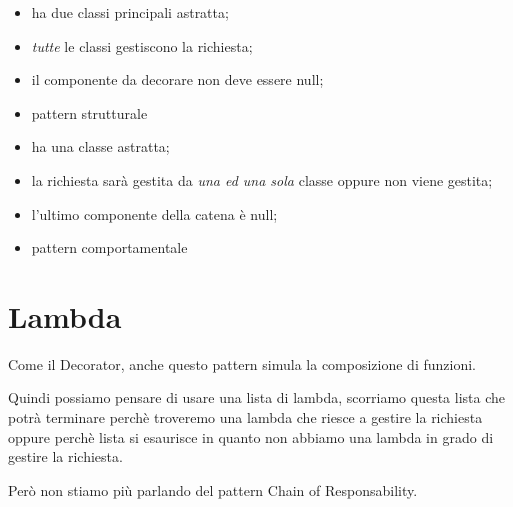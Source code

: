 \begin{multicols}{2}
    \begin{itemize}
        \item [] ha due classi principali astratta;
        \item [] \textit{tutte} le classi gestiscono la richiesta;
        \item [] il componente da decorare non deve essere null;
        \item [] pattern strutturale
    \end{itemize}
\columnbreak
    \begin{itemize}
        \item [] ha una classe astratta;
        \item [] la richiesta sarà gestita da \textit{una ed una sola} classe oppure non viene gestita;
        \item [] l'ultimo componente della catena è null;
        \item [] pattern comportamentale
    \end{itemize}
\end{multicols}

\section{Lambda}

Come il Decorator, anche questo pattern simula la composizione di funzioni.

Quindi possiamo pensare di usare una lista di lambda, scorriamo questa lista che potrà terminare perchè troveremo una lambda che riesce a gestire la richiesta oppure 
perchè lista si esaurisce in quanto non abbiamo una lambda in grado di gestire la richiesta.

Però non stiamo più parlando del pattern Chain of Responsability.
